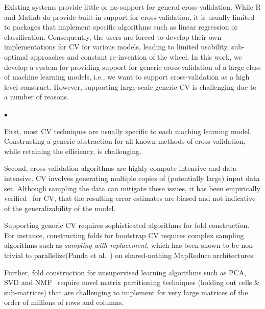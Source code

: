 \documentclass{vldb}
\newcommand{\eat}[1]{} %
\newenvironment{mylist}{\begin{list}{$\bullet$}
    {   \setlength{\itemsep}{2pt}
	        \setlength{\leftmargin}{10pt}
			        \setlength{\topsep}{2pt}}
					    }
						{\end{list}}
\begin{document}
Existing systems provide little or no support for general
cross-validation. While R and Matlab do provide built-in support for cross-validation,
it is usually limited to packages that implement specific algorithms such as
linear regression or classification. Consequently, the users are forced to develop their own
implementations for CV for various models, leading to limited usability,
sub-optimal approaches and constant re-invention of the wheel. 
In this work, we develop a system for providing support for generic
cross-validation of a large class of machine learning models, i.e., we want to
support cross-validation as a high level construct.
However, supporting large-scale generic CV is challenging due to a number of
reasons.
\begin{mylist}
\item First, most CV techniques are usually specific to each maching learning model.
Constructing a generic abstraction for all known methods of cross-validation, while
retaining the efficiency, is challenging.
\item Second, cross-validation algorithms are highly compute-intensive and
data-intensive. CV involves generating multiple copies of (potentially large) input data set.
Although sampling the data can mitigate these issues, it has been empirically
verified~\cite{journals/prl/IsakssonWGG08,journals/bioinformatics/Braga-NetoD04} for CV, that the
resulting error estimates are biased and not indicative of the generalizability of the
model.
\item Supporting generic CV requires sophisticated algorithms for fold
construction. For instance, constructing folds for bootstrap CV requires complex sampling algorithms
such as {\em sampling with replacement}, which has been shown to be non-trivial to
parallelize(Panda et al.~\cite{DBLP:journals/pvldb/PandaHBB09}) on shared-nothing MapReduce architectures.
\item Further, fold construction for unsupervised learning algorithms such as PCA, SVD and
NMF~\cite{DBLP:conf/nips/LeeS00} require novel matrix partitioning techniques
(holding out cells \& sub-matrices) that are challenging to implement for very
large matrices of the order of millions of rows and columns.

\eat{
Parallelizing sampling {\em with replacement} over MapReduce is
non-trivial as has been shown 
\item Fourth, supporting cross-validation using bootstrapping requires
scalably implementing novel sampling algorithms over distributed MapReduce
architectures. As described in Panda et al.
scalably parallelizing sampling with replacement over MapReduce is non-trivial
since it requires maintaining state in memory which is inefficient in
shared-nothing architectures.
}
\end{mylist}
\end{document}
